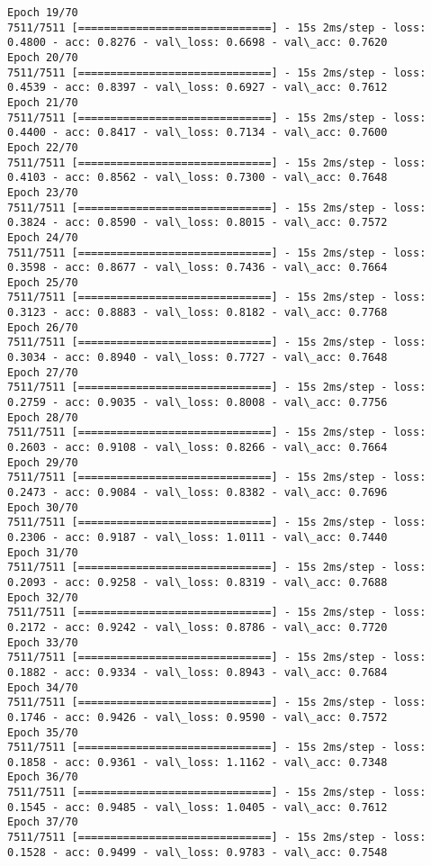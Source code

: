\documentclass[11pt]{article}
\begin{document}
\begin{Verbatim}[commandchars=\\\{\}]
Epoch 19/70
7511/7511 [==============================] - 15s 2ms/step - loss: 0.4800 - acc: 0.8276 - val\_loss: 0.6698 - val\_acc: 0.7620
Epoch 20/70
7511/7511 [==============================] - 15s 2ms/step - loss: 0.4539 - acc: 0.8397 - val\_loss: 0.6927 - val\_acc: 0.7612
Epoch 21/70
7511/7511 [==============================] - 15s 2ms/step - loss: 0.4400 - acc: 0.8417 - val\_loss: 0.7134 - val\_acc: 0.7600
Epoch 22/70
7511/7511 [==============================] - 15s 2ms/step - loss: 0.4103 - acc: 0.8562 - val\_loss: 0.7300 - val\_acc: 0.7648
Epoch 23/70
7511/7511 [==============================] - 15s 2ms/step - loss: 0.3824 - acc: 0.8590 - val\_loss: 0.8015 - val\_acc: 0.7572
Epoch 24/70
7511/7511 [==============================] - 15s 2ms/step - loss: 0.3598 - acc: 0.8677 - val\_loss: 0.7436 - val\_acc: 0.7664
Epoch 25/70
7511/7511 [==============================] - 15s 2ms/step - loss: 0.3123 - acc: 0.8883 - val\_loss: 0.8182 - val\_acc: 0.7768
Epoch 26/70
7511/7511 [==============================] - 15s 2ms/step - loss: 0.3034 - acc: 0.8940 - val\_loss: 0.7727 - val\_acc: 0.7648
Epoch 27/70
7511/7511 [==============================] - 15s 2ms/step - loss: 0.2759 - acc: 0.9035 - val\_loss: 0.8008 - val\_acc: 0.7756
Epoch 28/70
7511/7511 [==============================] - 15s 2ms/step - loss: 0.2603 - acc: 0.9108 - val\_loss: 0.8266 - val\_acc: 0.7664
Epoch 29/70
7511/7511 [==============================] - 15s 2ms/step - loss: 0.2473 - acc: 0.9084 - val\_loss: 0.8382 - val\_acc: 0.7696
Epoch 30/70
7511/7511 [==============================] - 15s 2ms/step - loss: 0.2306 - acc: 0.9187 - val\_loss: 1.0111 - val\_acc: 0.7440
Epoch 31/70
7511/7511 [==============================] - 15s 2ms/step - loss: 0.2093 - acc: 0.9258 - val\_loss: 0.8319 - val\_acc: 0.7688
Epoch 32/70
7511/7511 [==============================] - 15s 2ms/step - loss: 0.2172 - acc: 0.9242 - val\_loss: 0.8786 - val\_acc: 0.7720
Epoch 33/70
7511/7511 [==============================] - 15s 2ms/step - loss: 0.1882 - acc: 0.9334 - val\_loss: 0.8943 - val\_acc: 0.7684
Epoch 34/70
7511/7511 [==============================] - 15s 2ms/step - loss: 0.1746 - acc: 0.9426 - val\_loss: 0.9590 - val\_acc: 0.7572
Epoch 35/70
7511/7511 [==============================] - 15s 2ms/step - loss: 0.1858 - acc: 0.9361 - val\_loss: 1.1162 - val\_acc: 0.7348
Epoch 36/70
7511/7511 [==============================] - 15s 2ms/step - loss: 0.1545 - acc: 0.9485 - val\_loss: 1.0405 - val\_acc: 0.7612
Epoch 37/70
7511/7511 [==============================] - 15s 2ms/step - loss: 0.1528 - acc: 0.9499 - val\_loss: 0.9783 - val\_acc: 0.7548

\end{Verbatim}
\end{document}
